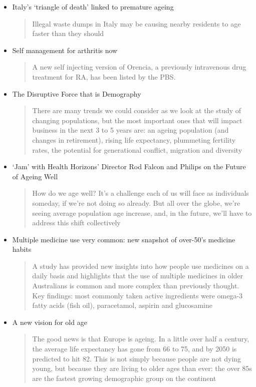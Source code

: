 \begin{itemize}
	\item Italy's `triangle of death' linked to premature ageing
	\begin{quotation}Illegal waste dumps in Italy may be causing nearby residents to age faster than they should\end{quotation}
	\item Self management for arthritis now
	\begin{quotation}A new self injecting version of Orencia, a previously intravenous drug treatment for RA, has been listed by the PBS.\end{quotation}
	\item The Disruptive Force that is Demography
	\begin{quotation}There are many trends we could consider as we look at the study of changing populations, but the most important ones that will impact business in the next 3 to 5 years are: an ageing population (and changes in retirement), rising life expectancy, plummeting fertility rates, the potential for generational conflict, migration and diversity\end{quotation}
	\item `Jam' with Health Horizons' Director Rod Falcon and Philips on the Future of Ageing Well
	\begin{quotation}How do we age well? It's a challenge each of us will face as individuals someday, if we're not doing so already. But all over the globe, we're seeing average population age increase, and, in the future, we'll have to address this shift collectively\end{quotation}
	\item Multiple medicine use very common: new snapshot of over-50's medicine habits
	\begin{quotation}A study has provided new insights into how people use medicines on a daily basis and highlights that the use of multiple medicines in older Australians is common and more complex than previously thought. Key findings: most commonly taken active ingredients were omega-3 fatty acids (fish oil), paracetamol, aspirin and glucosamine\end{quotation}
	\item A new vision for old age
	\begin{quotation}The good news is that Europe is ageing. In a little over half a century, the average life expectancy has gone from 66 to 75, and by 2050 is predicted to hit 82. This is not simply because people are not dying young, but because they are living to older ages than ever: the over 85s are the fastest growing demographic group on the continent\end{quotation}

\end{itemize}
